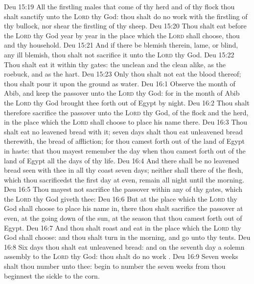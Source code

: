 \vs Deu 15:19 All the firstling males that come of thy herd and of thy flock thou shalt sanctify unto the \textsc{Lord} thy God: thou shalt do no work with the firstling of thy bullock, nor shear the firstling of thy sheep.
\vs Deu 15:20 Thou shalt eat  before the \textsc{Lord} thy God year by year in the place which the \textsc{Lord} shall choose, thou and thy household.
\vs Deu 15:21 And if there be  blemish therein,  lame, or blind,  any ill blemish, thou shalt not sacrifice it unto the \textsc{Lord} thy God.
\vs Deu 15:22 Thou shalt eat it within thy gates: the unclean and the clean  alike, as the roebuck, and as the hart.
\vs Deu 15:23 Only thou shalt not eat the blood thereof; thou shalt pour it upon the ground as water.
\vs Deu 16:1 Observe the month of Abib, and keep the passover unto the \textsc{Lord} thy God: for in the month of Abib the \textsc{Lord} thy God brought thee forth out of Egypt by night.
\vs Deu 16:2 Thou shalt therefore sacrifice the passover unto the \textsc{Lord} thy God, of the flock and the herd, in the place which the \textsc{Lord} shall choose to place his name there.
\vs Deu 16:3 Thou shalt eat no leavened bread with it; seven days shalt thou eat unleavened bread therewith,  the bread of affliction; for thou camest forth out of the land of Egypt in haste: that thou mayest remember the day when thou camest forth out of the land of Egypt all the days of thy life.
\vs Deu 16:4 And there shall be no leavened bread seen with thee in all thy coast seven days; neither shall there  of the flesh, which thou sacrificedst the first day at even, remain all night until the morning.
\vs Deu 16:5 Thou mayest not sacrifice the passover within any of thy gates, which the \textsc{Lord} thy God giveth thee:
\vs Deu 16:6 But at the place which the \textsc{Lord} thy God shall choose to place his name in, there thou shalt sacrifice the passover at even, at the going down of the sun, at the season that thou camest forth out of Egypt.
\vs Deu 16:7 And thou shalt roast and eat  in the place which the \textsc{Lord} thy God shall choose: and thou shalt turn in the morning, and go unto thy tents.
\vs Deu 16:8 Six days thou shalt eat unleavened bread: and on the seventh day  a solemn assembly to the \textsc{Lord} thy God: thou shalt do no work .
\vs Deu 16:9 Seven weeks shalt thou number unto thee: begin to number the seven weeks from  thou beginnest  the sickle to the corn.
